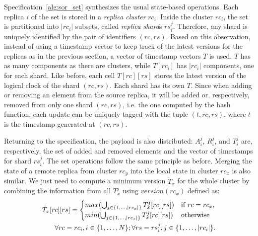 \begin{algorithm}[t]
{
 }
\end{algorithm}

Specification~\ref{alg:sor_set} synthesizes the usual state-based operations.
Each replica $i$ of the set is stored in a \textit{replica cluster} $rc_{i}$.
Inside the cluster $rc_{i}$, the set is partitioned into $|rc_{i}|$ subsets,
called \textit{replica shard}s $rs_{i}^{j}$. Therefore, any shard is uniquely
identified by the pair of identifiers $(rc, rs)$. Based on this observation,
instead of using a timestamp vector to keep track of the latest versions for the
replicas as in the previous section, a vector of timestamp vectors $T$ is
used. $T$ has as many components as there are clusters, while $T[rc_{i}]$ has
$|rc_{i}|$ components, one for each shard. Like before, each cell $T[rc][rs]$
stores the latest version of the logical clock of the shard $(rc, rs)$. Each
shard has its own $T$. Since when adding or removing an element from the source
replica, it will be added or, respectively, removed from only one shard $(rc,
rs)$, i.e. the one computed by the hash function, each update can be uniquely
tagged with the tuple $(t, rc, rs)$, where $t$ is the timestamp generated at
$(rc, rs)$.

Returning to the specification, the payload is also distributed: $A_{i}^{j}$,
$R_{i}^{j}$, and $T_{i}^{j}$ are, respectively, the set of added and removed
elements and the vector of timestamps for shard $rs_{i}^{j}$. The set operations
follow the same principle as before. Merging the state of a remote replica from
cluster $rc_{y}$ into the local state in cluster $rc_{x}$ is also similar. We
just need to compute a minimum version $\tilde{T}_{x}$ for the whole cluster by
combining the information from all $T_{x}^{j}$ using $version(rc_{x})$ defined
as:
\small
\begin{align*}
\tilde{T}_{x}[rc][rs] = \begin{cases}
                            max (\bigcup_{j \in \{1,\ldots,|rc_{x}|\}} T_{x}^{j}[rc][rs]) & \text{if } rc = rc_{x}, \\
                            min (\bigcup_{j \in \{1,\ldots,|rc_{x}|\}} T_{x}^{j}[rc][rs]) & \text{otherwise}
                        \end{cases}
\\
\hfill \forall rc = rc_{i}, i \in \{1,\ldots,N\}; \forall rs = rs_{i}^{j}, j \in \{1,\ldots,|rc_{i}|\}.
\end{align*}
\normalsize

